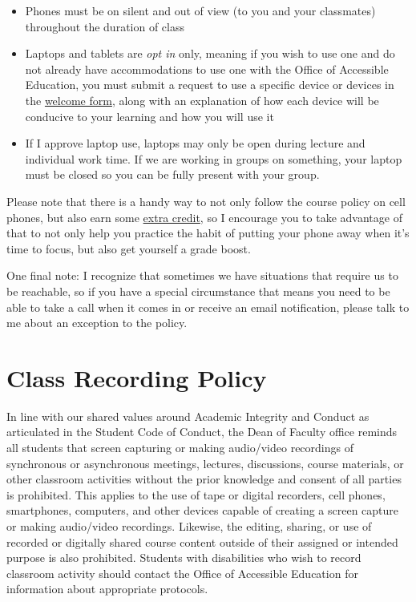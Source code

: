 \documentclass[
  letterpaper,
  DIV=11,
  numbers=noendperiod]{scrartcl}
\providecommand{\tightlist}{%
  \setlength{\itemsep}{0pt}\setlength{\parskip}{0pt}}
\begin{document}
\begin{itemize}
\tightlist
\item
  Phones must be on silent and out of view (to you and your classmates)
  throughout the duration of class
\item
  Laptops and tablets are \emph{opt in} only, meaning if you wish to use
  one and do not already have accommodations to use one with the Office
  of Accessible Education, you must submit a request to use a specific
  device or devices in the
  \href{https://forms.gle/NUZQSNaDPxXRTite8}{welcome form}, along with
  an explanation of how each device will be conducive to your learning
  and how you will use it
\item
  If I approve laptop use, laptops may only be open during lecture and
  individual work time. If we are working in groups on something, your
  laptop must be closed so you can be fully present with your group.
\end{itemize}

Please note that there is a handy way to not only follow the course
policy on cell phones, but also earn some \hyperref[roundup]{extra
credit}, so I encourage you to take advantage of that to not only help
you practice the habit of putting your phone away when it's time to
focus, but also get yourself a grade boost.

One final note: I recognize that sometimes we have situations that
require us to be reachable, so if you have a special circumstance that
means you need to be able to take a call when it comes in or receive an
email notification, please talk to me about an exception to the policy.

\section{Class Recording Policy}\label{recording}

In line with our shared values around Academic Integrity and Conduct as
articulated in the Student Code of Conduct, the Dean of Faculty office
reminds all students that screen capturing or making audio/video
recordings of synchronous or asynchronous meetings, lectures,
discussions, course materials, or other classroom activities without the
prior knowledge and consent of all parties is prohibited. This applies
to the use of tape or digital recorders, cell phones, smartphones,
computers, and other devices capable of creating a screen capture or
making audio/video recordings. Likewise, the editing, sharing, or use of
recorded or digitally shared course content outside of their assigned or
intended purpose is also prohibited. Students with disabilities who wish
to record classroom activity should contact the Office of Accessible
Education for information about appropriate protocols.
\end{document}
